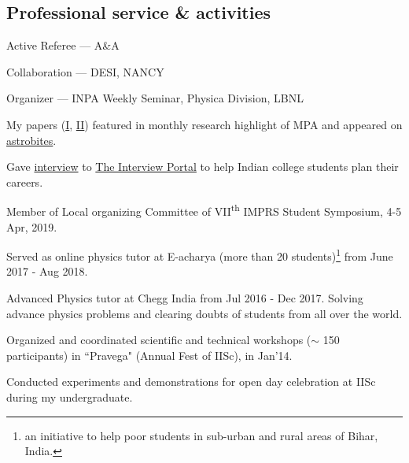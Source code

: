 \documentclass[12pt,letterpaper]{article}
\begin{document}

\subsection{Professional service \& activities}
\begin{list}{}{\cvlist}
  \item Active Referee ---
        A\&A
  \item Collaboration ---
        DESI, NANCY
  \item Organizer ---
        INPA Weekly Seminar, Physica Division, LBNL
  \item My papers (\href{https://www.mpa-garching.mpg.de/964620/hl202107}{I}, \href{https://www.mpa-garching.mpg.de/1066558/hl202211?c=27981}{II}) featured in monthly research highlight of MPA and appeared on \href{https://astrobites.org/2021/05/06/cool-metal-gas-search-thanks-it-was-automated/}{astrobites}.
  \item Gave \href{https://theinterviewportal.com/2020/03/13/astrophysicist-interview-8/}{interview} to \href{https://theinterviewportal.com/}{The Interview Portal} to help Indian college students plan their careers. 
  \item Member of Local organizing Committee of VII\textsuperscript{th} IMPRS Student Symposium, 4-5 Apr, 2019.
  \item Served as online physics tutor at E-acharya (more than 20 students)\footnote{an initiative to help poor students in sub-urban and rural areas of Bihar, India.} from June 2017 - Aug 2018.
  \item Advanced Physics tutor at Chegg India from Jul 2016 - Dec 2017. Solving advance physics problems and clearing doubts of students from all over the world.
  \item Organized and coordinated scientific and technical workshops ($\sim$ 150 participants) in  ``Pravega" (Annual Fest of IISc), in Jan'14.
  \item Conducted experiments and demonstrations for open day celebration at IISc during my undergraduate.
\end{list}
\end{document}

